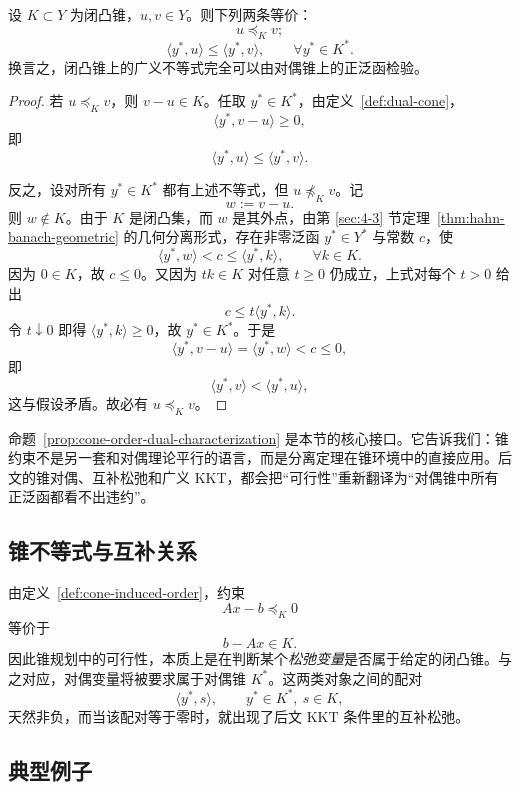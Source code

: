 \begin{proposition}[锥序的对偶刻画]\label{prop:cone-order-dual-characterization}
设 $K\subset Y$ 为闭凸锥，$u,v\in Y$。则下列两条等价：
\[
u\preceq_K v;
\]
\[
\langle y^\ast,u\rangle\le \langle y^\ast,v\rangle,\qquad \forall y^\ast\in K^\ast.
\]
换言之，闭凸锥上的广义不等式完全可以由对偶锥上的正泛函检验。
\end{proposition}

\begin{proof}
若 $u\preceq_K v$，则 $v-u\in K$。任取 $y^\ast\in K^\ast$，由定义~\ref{def:dual-cone}，
\[
\langle y^\ast,v-u\rangle\ge 0,
\]
即
\[
\langle y^\ast,u\rangle\le \langle y^\ast,v\rangle.
\]

反之，设对所有 $y^\ast\in K^\ast$ 都有上述不等式，但 $u\not\preceq_K v$。记
\[
w:=v-u.
\]
则 $w\notin K$。由于 $K$ 是闭凸集，而 $w$ 是其外点，由第 \ref{sec:4-3} 节定理~\ref{thm:hahn-banach-geometric} 的几何分离形式，存在非零泛函 $y^\ast\in Y^\ast$ 与常数 $c$，使
\[
\langle y^\ast,w\rangle<c\le \langle y^\ast,k\rangle,\qquad \forall k\in K.
\]
因为 $0\in K$，故 $c\le 0$。又因为 $tk\in K$ 对任意 $t\ge 0$ 仍成立，上式对每个 $t>0$ 给出
\[
c\le t\langle y^\ast,k\rangle.
\]
令 $t\downarrow 0$ 即得 $\langle y^\ast,k\rangle\ge 0$，故 $y^\ast\in K^\ast$。于是
\[
\langle y^\ast,v-u\rangle=\langle y^\ast,w\rangle<c\le 0,
\]
即
\[
\langle y^\ast,v\rangle<\langle y^\ast,u\rangle,
\]
这与假设矛盾。故必有 $u\preceq_K v$。
\end{proof}

\begin{remark}
命题~\ref{prop:cone-order-dual-characterization} 是本节的核心接口。它告诉我们：锥约束不是另一套和对偶理论平行的语言，而是分离定理在锥环境中的直接应用。后文的锥对偶、互补松弛和广义 KKT，都会把“可行性”重新翻译为“对偶锥中所有正泛函都看不出违约”。
\end{remark}

\subsection{锥不等式与互补关系}

由定义~\ref{def:cone-induced-order}，约束
\[
Ax-b\preceq_K 0
\]
等价于
\[
b-Ax\in K.
\]
因此锥规划中的可行性，本质上是在判断某个\emph{松弛变量}是否属于给定的闭凸锥。与之对应，对偶变量将被要求属于对偶锥 $K^\ast$。这两类对象之间的配对
\[
\langle y^\ast,s\rangle,\qquad y^\ast\in K^\ast,\ s\in K,
\]
天然非负，而当该配对等于零时，就出现了后文 KKT 条件里的互补松弛。

\subsection{典型例子}

